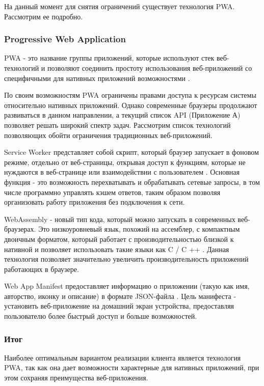 На данный момент для снятия ограничений существует технология PWA. Рассмотрим ее подробно.


\subsubsection{Progressive Web Application}

PWA - это название группы приложений, которые используют стек веб-технологий и позволяют соединить простоту использования веб-приложений со специфичными для нативных приложений  возможностями \cite{progressive-web-applications}.

По своим возможностям PWA ограничены правами доступа к ресурсам системы относительно нативных приложений.
Однако современные браузеры продолжают развиваться в данном направлении, а текущий список API (Приложение А) позволяет решать широкий спектр задач.
Рассмотрим список технологий позволяющих обойти ограничения традиционных веб-приложений.

Service Worker представляет собой скрипт, который браузер запускает в фоновом режиме, отдельно от веб-страницы, открывая доступ к функциям, которые не нуждаются в веб-странице или взаимодействии с пользователем \cite{service-worker}.
Основная функция - это возможность перехватывать и обрабатывать сетевые запросы, в том числе программно управлять кэшем ответов, таким образом позволяя организовать работу приложения без подключения к сети.

WebAssembly - новый тип кода, который можно запускать в современных веб-браузерах. Это низкоуровневый язык, похожий на ассемблер, с компактным двоичным форматом, который работает с производительностью близкой к нативной и позволяет использовать такие языки как C / C ++ \cite{web-assembly}.
Данная технология позволяет значительно увеличить производительность приложений работающих в браузере.

Web App Manifest предоставляет информацию о приложении (такую как имя, авторство, иконку и описание) в формате JSON-файла \cite{web-app-manifest}.
Цель манифеста - установить веб-приложение на домашний экран устройства, предоставляя пользователю более быстрый доступ и больше возможностей.

\subsubsection{Итог}

Наиболее оптимальным вариантом реализации клиента является технология PWA, так как она дает возможности характерные для нативных приложений, при этом сохраняя преимущества веб-приложения.

\clearpage